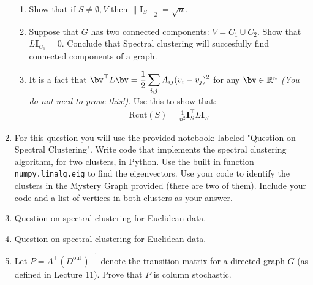 \documentclass[10pt]{article}
\begin{document}
\begin{enumerate}
\begin{enumerate}
	\item Show that if $S \neq \emptyset, V$ then $\|\mathbf{I}_{S}\|_{2} = \sqrt{n}$. \\
	\item Suppose that $G$ has two connected components: $V = C_1\cup C_2$. Show that $L\mathbf{I}_{C_1} = 0$. Conclude that Spectral clustering will succesfully find connected components of a graph. \\
	\item It is a fact that $\displaystyle \bv^{\top}L\bv = \frac{1}{2}\sum_{i,j}A_{ij}(v_i - v_{j})^{2}$ for any $\bv\in \mathbb{R}^{n}$ {\em (You do not need to prove this!)}. Use this to show that:
	\begin{align*}
		 \text{Rcut}(S) = \frac{1}{n^{2}} \mathbf{I}_{S}^{\top}L\mathbf{I}_{S}
	\end{align*}
\end{enumerate}



\item For this question you will use the provided notebook: labeled "Question on Spectral Clustering". Write code that implements the spectral clustering algorithm, for two clusters, in Python. Use the built in function {\tt numpy.linalg.eig} to find the eigenvectors. Use your code to identify the clusters in the Mystery Graph provided (there are two of them). Include your code and a list of vertices in both clusters as your answer. \\

\item Question on spectral clustering for Euclidean data. \\

\item Question on spectral clustering for Euclidean data. \\

\item Let $P = A^{\top}(D^{\text{out}})^{-1}$ denote the transition matrix for a directed graph $G$ (as defined in Lecture 11). Prove that $P$ is column stochastic. \\



\end{enumerate}
\end{document}
